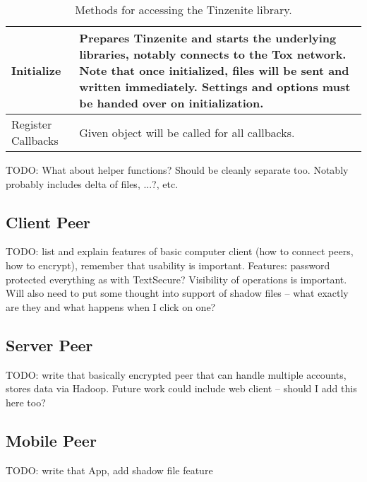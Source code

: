 \begin{table}[H]
\centering
\begin{tabulary}{\textwidth}{p{2.5cm} || J}
	Initialize & Prepares Tinzenite and starts the underlying libraries, notably connects to the Tox network. Note that once initialized, files will be sent and written immediately. Settings and options must be handed over on initialization.\\
	\hline
    Register Callbacks & Given object will be called for all callbacks.\\
\end{tabulary}
\caption[Tinzenite Library API]{Methods for accessing the Tinzenite library.}
\label{table:lib:api}
\end{table}

TODO: What about helper functions?
Should be cleanly separate too.
Notably probably includes delta of files, ...?, etc.

\subsection{Client Peer}

TODO: list and explain features of basic computer client (how to connect peers, how to encrypt), remember that usability is important.
Features: password protected everything as with TextSecure?
Visibility of operations is important.
Will also need to put some thought into support of shadow files – what exactly are they and what happens when I click on one?

\subsection{Server Peer}

TODO: write that basically encrypted peer that can handle multiple accounts, stores data via Hadoop.
Future work could include web client – should I add this here too?

\subsection{Mobile Peer}

TODO: write that App, add shadow file feature
